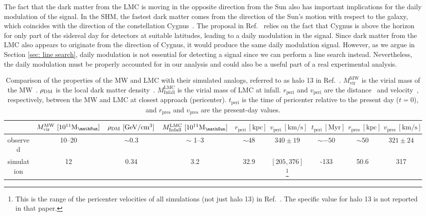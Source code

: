 \documentclass[aps,prd,amsmath,amssymb,10pt,letterpaper,balancelastpage,showpacs,superscriptaddress,nofootinbib,floatfix,notitlepage,longbibliography,twocolumn
]{revtex4-2}
\newcommand{\kms}{\text{km}/\text{s}}
\newcommand{\Msun}{\mathrm{M}_{\mathSun}}
\begin{document}
The fact that the dark matter from the LMC is moving in the opposite direction from the Sun also has important implications for the daily modulation of the signal. In the SHM, the fastest dark matter comes from the direction of the Sun's motion with respect to the galaxy, which coincides with the direction of the constellation Cygnus~\cite{Directional_DM}. The proposal in Ref.~\cite{Luminous} relies on the fact that Cygnus is above the horizon for only part of the sidereal day for detectors at suitable latitudes, leading to a daily modulation in the signal. Since dark matter from the LMC also appears to originate from the direction of Cygnus, it would produce the same daily modulation signal. However, as we argue in Section \ref{sec: line search},  daily modulation is not essential for detecting a signal since we can perform a line search instead. Nevertheless, the daily modulation must be properly accounted for in our analysis and could also be a useful part of a real experimental analysis.

\begin{table}[t!] %
    \centering
    \begin{tabular}{|c|c|c|c|c|c|c|c|c|} \hline 
         &  $M^{\text{MW}}_{\text{vir}} 
 ~[10^{11} \Msun]$ &$\rho_{\rm DM}~[\text{GeV}/\text{cm}^3]$&  $M^{\text{LMC}}_{\text{Infall}} ~[10^{11} \Msun]$ &  $r_{\text{peri}} ~[\text{kpc}]$ &$v_{\text{peri}}~[\kms]$& $t_{\text{peri}} ~[\text{Myr}]$&$r_{\text{pres}} ~[\text{kpc}]$ &$v_{\text{pres}} ~[\kms]$\\ \hline 
         observed&  10--20 &$\sim 0.3$&   $\sim$ 1--3 &  $\sim 48$  &$340 \pm 19$& $\sim -50$ & $\sim50$ &$321 \pm 24$\\ \hline 
         simulation&  12 &0.34&  3.2&  32.9 &$[205,376]$\footnote{This is the range of the pericenter velocities of all simulations (not just halo 13) in Ref.~\cite{LMC}. The specific value for halo 13 is not reported in that paper.}& -133 & 50.6&317\\ \hline
    \end{tabular}
    \caption{Comparison of the properties of the MW and LMC with their simulated analogs, referred to as halo 13 in Ref.~\cite{LMC}. $M^{\text{MW}}_{\text{vir}}$ is the virial mass of the MW~\cite{MWMass}. $\rho_{\rm DM}$ is the local dark matter density~\cite{DarkMatterDensity}. $M^{\text{LMC}}_{\text{Infall}}$ is the virial mass of LMC at infall. $r_{\text{peri}}$ and $v_{\text{peri}}$ are the distance~\cite{LMCHighSpeed} and velocity~\cite{LMC_velocity}, respectively, between the MW and LMC at closest approach (pericenter). $t_{\text{peri}}$ is the time of pericenter relative to the present day ($t=0$), and $r_{\text{pres}} $ and $v_{\text{pres}}$ are the present-day values.}
    \label{tab: halo 13}
\end{table}
\end{document}
